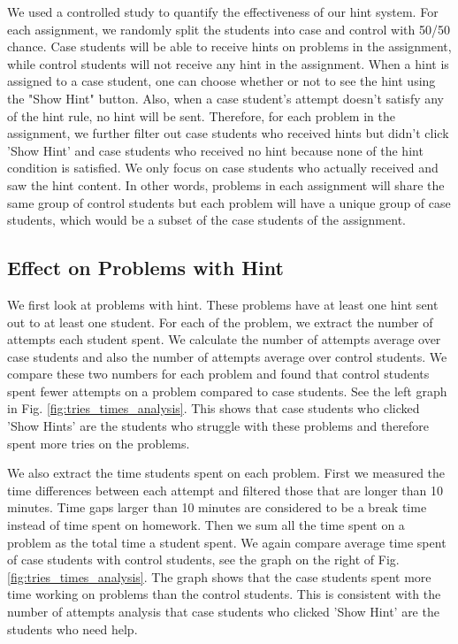 \documentclass{llncs}
\begin{document}
We used a controlled study to quantify the effectiveness of our hint system. For each assignment, we randomly split the students into case and control with 50/50 chance. Case students will be able to receive hints on problems in the assignment, while control students will not receive any hint in the assignment. When a hint is assigned to a case student, one can choose whether or not to see the hint using the "Show Hint" button. Also, when a case student's attempt doesn't satisfy any of the hint rule, no hint will be sent. Therefore, for each problem in the assignment, we further filter out case students who received hints but didn't click 'Show Hint' and case students who received no hint because none of the hint condition is satisfied. We only focus on case students who actually received and saw the hint content. In other words, problems in each assignment will share the same group of control students but each problem will have a unique group of case students, which would be a subset of the case students of the assignment.

\subsection{Effect on Problems with Hint}
We first look at problems with hint. These problems have at least one hint sent out to at least one student. For each of the problem, we extract the number of attempts each student spent. We calculate the number of attempts average over case students and also the number of attempts average over control students. We compare these two numbers for each problem and found that control students spent fewer attempts on a problem compared to case students. See the left graph in Fig. \ref{fig:tries_times_analysis}. This shows that case students who clicked 'Show Hints' are the students who struggle with these problems and therefore spent more tries on the problems.

We also extract the time students spent on each problem. First we measured the time differences between each attempt and filtered those that are longer than 10 minutes. Time gaps larger than 10 minutes are considered to be a break time instead of time spent on homework. Then we sum all the time spent on a problem as the total time a student spent. We again compare average time spent of case students with control students, see the graph on the right of Fig. \ref{fig:tries_times_analysis}. The graph shows that the case students spent more time working on problems than the control students. This is consistent with the number of attempts analysis that case students who clicked 'Show Hint' are the students who need help.
\end{document}
